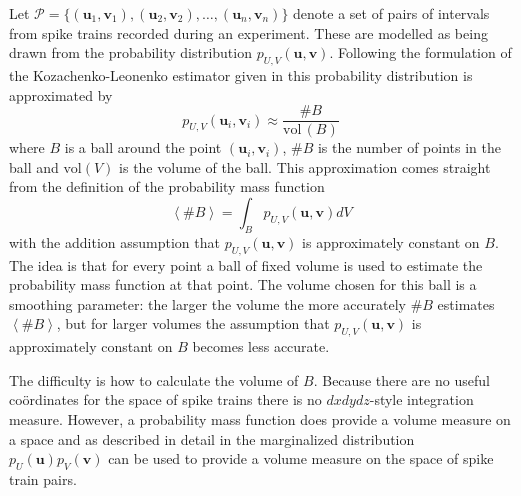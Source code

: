 \documentclass[12pt]{article}
\renewcommand{\u}{\mathbf{u}}
\renewcommand{\v}{\mathbf{v}}
\begin{document}
Let $ \mathcal{P}=\{(\u_1,\v_1),(\u_2,\v_2),\ldots,(\u_n,\v_n)\} $
denote a set of pairs of intervals from spike trains recorded during an
experiment. These are modelled as being drawn from the probability
distribution $p_{U,V}(\u,\v)$. Following the formulation of the
Kozachenko-Leonenko estimator given in \citet{Houghton2015} this
probability distribution is approximated by
\begin{equation}
 p_{U,V}(\u_i,\v_i)\approx\frac{\#B}{\mbox{vol}\,(B)}
\end{equation}
where $B$ is a ball around the point $(\u_i,\v_i)$, $\#B$ is the number of
points in the ball and $\mbox{vol}(V)$ is the volume of the ball. This
approximation comes straight from the definition of the probability mass function
\begin{equation}
\left\langle \#B\right\rangle = \int_B p_{U,V}(\u,\v)dV
\end{equation}
with the addition assumption that $p_{U,V}(\u,\v)$ is approximately
constant on $B$. The idea is that for every point a ball of fixed
volume is used to estimate the probability mass function at that
point. The volume chosen for this ball is a smoothing parameter: the
larger the volume the more accurately $\#B$ estimates $\left\langle
\#B\right\rangle$, but for larger volumes the assumption that
$p_{U,V}(\u,\v)$ is approximately constant on $B$ becomes less
accurate.

The difficulty is how to calculate the volume of $B$. Because there
are no useful co\"{o}rdinates for the space of spike trains there is no
$dxdydz$-style integration measure. However, a probability
mass function does provide a volume measure on a space and as
described in detail in \citet{Houghton2015} the marginalized
distribution $p_U(\u)p_V(\v)$ can be used to provide a volume measure
on the space of spike train pairs.
\end{document}
